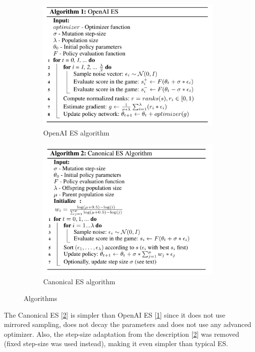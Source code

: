 \documentclass[10pt]{article} %
\begin{document}
\begin{figure}[ht]
\begin{subfigure}{.49\textwidth}
		\centering
		\includegraphics[width=.95\linewidth]{figures/OpenAI_ES.png}
		\caption{OpenAI ES algorithm}
		\label{openai}
\end{subfigure}
\begin{subfigure}{.49\textwidth}
		\centering
		\includegraphics[width=.95\linewidth]{figures/Canonical_ES.png}
		\caption{Canonical ES algorithm}
		\label{canonical}
\end{subfigure}
\caption{Algorithms}
\label{fig:algorithms}
\end{figure}

The Canonical ES [\ref{canonical}] is simpler than OpenAI ES [\ref{openai}] since it does not use mirrored sampling, does not decay the parameters and does not use any advanced optimizer. Also, the step-size adaptation from the description [\ref{canonical}] was removed (fixed step-size was used instead), making it even simpler than typical ES.
\end{document}
